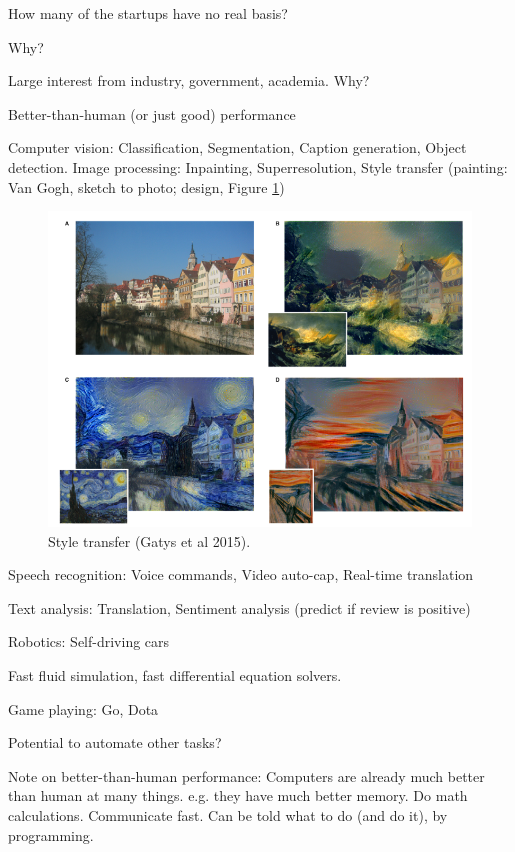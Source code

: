 \documentclass[english]{article}
\begin{document}
How many of the startups have no real basis? 
\eitem



\item Why?

\bitem
\item Large interest from industry, government, academia. Why?

\item Better-than-human (or just good) performance %
\bitem
\item Computer vision: Classification, Segmentation, Caption generation, Object detection. Image processing: Inpainting, Superresolution, Style transfer (painting: Van Gogh, sketch to photo; design, Figure \ref{st})%

\begin{figure}
  \centering
  \includegraphics[scale=0.5]{st.png}
  \caption{Style transfer (Gatys et al 2015).}
  \label{st}
\end{figure}

\item Speech recognition: Voice commands, Video auto-cap, Real-time translation
\item Text analysis: Translation, Sentiment analysis (predict if review is positive)
\item Robotics: Self-driving cars
\item Fast fluid simulation, fast differential equation solvers.
\item Game playing: Go, Dota
\eitem
\item Potential to automate other tasks?
\item Note on better-than-human performance: Computers are already much better than human at many things. e.g. they have much better memory. Do math calculations. Communicate fast. Can be told what to do (and do it), by programming.
\end{document}
